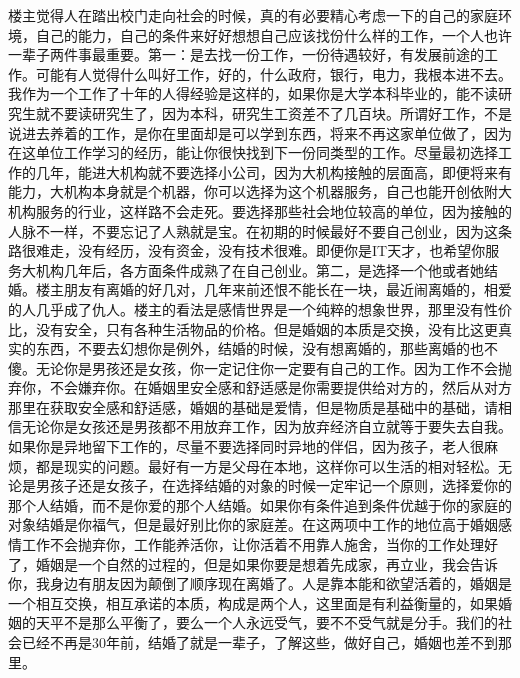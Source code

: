 楼主觉得人在踏出校门走向社会的时候，真的有必要精心考虑一下的自己的家庭环境，自己的能力，自己的条件来好好想想自己应该找份什么样的工作，一个人也许一辈子两件事最重要。第一：是去找一份工作，一份待遇较好，有发展前途的工作。可能有人觉得什么叫好工作，好的，什么政府，银行，电力，我根本进不去。我作为一个工作了十年的人得经验是这样的，如果你是大学本科毕业的，能不读研究生就不要读研究生了，因为本科，研究生工资差不了几百块。所谓好工作，不是说进去养着的工作，是你在里面却是可以学到东西，将来不再这家单位做了，因为在这单位工作学习的经历，能让你很快找到下一份同类型的工作。尽量最初选择工作的几年，能进大机构就不要选择小公司，因为大机构接触的层面高，即便将来有能力，大机构本身就是个机器，你可以选择为这个机器服务，自己也能开创依附大机构服务的行业，这样路不会走死。要选择那些社会地位较高的单位，因为接触的人脉不一样，不要忘记了人熟就是宝。在初期的时候最好不要自己创业，因为这条路很难走，没有经历，没有资金，没有技术很难。即便你是IT天才，也希望你服务大机构几年后，各方面条件成熟了在自己创业。第二，是选择一个他或者她结婚。楼主朋友有离婚的好几对，几年来前还恨不能长在一块，最近闹离婚的，相爱的人几乎成了仇人。楼主的看法是感情世界是一个纯粹的想象世界，那里没有性价比，没有安全，只有各种生活物品的价格。但是婚姻的本质是交换，没有比这更真实的东西，不要去幻想你是例外，结婚的时候，没有想离婚的，那些离婚的也不傻。无论你是男孩还是女孩，你一定记住你一定要有自己的工作。因为工作不会抛弃你，不会嫌弃你。在婚姻里安全感和舒适感是你需要提供给对方的，然后从对方那里在获取安全感和舒适感，婚姻的基础是爱情，但是物质是基础中的基础，请相信无论你是女孩还是男孩都不用放弃工作，因为放弃经济自立就等于要失去自我。如果你是异地留下工作的，尽量不要选择同时异地的伴侣，因为孩子，老人很麻烦，都是现实的问题。最好有一方是父母在本地，这样你可以生活的相对轻松。无论是男孩子还是女孩子，在选择结婚的对象的时候一定牢记一个原则，选择爱你的那个人结婚，而不是你爱的那个人结婚。如果你有条件追到条件优越于你的家庭的对象结婚是你福气，但是最好别比你的家庭差。在这两项中工作的地位高于婚姻感情工作不会抛弃你，工作能养活你，让你活着不用靠人施舍，当你的工作处理好了，婚姻是一个自然的过程的，但是如果你要是想着先成家，再立业，我会告诉你，我身边有朋友因为颠倒了顺序现在离婚了。人是靠本能和欲望活着的，婚姻是一个相互交换，相互承诺的本质，构成是两个人，这里面是有利益衡量的，如果婚姻的天平不是那么平衡了，要么一个人永远受气，要不不受气就是分手。我们的社会已经不再是30年前，结婚了就是一辈子，了解这些，做好自己，婚姻也差不到那里。


